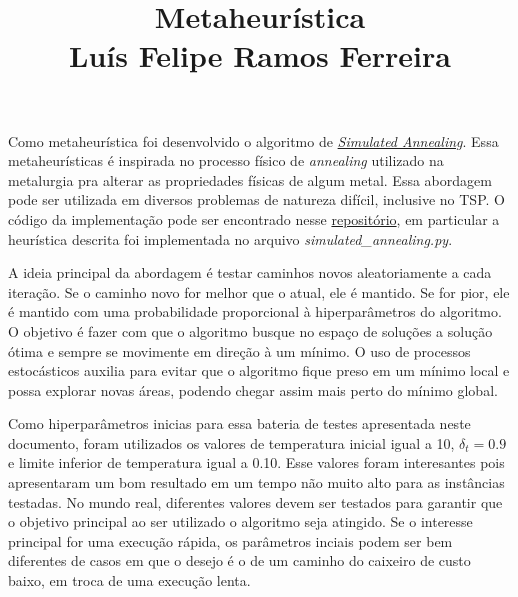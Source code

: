 \documentclass{article}
\title{\vspace{-3em} Metaheurística \\ Luís Felipe Ramos Ferreira \vspace{-3em}}
\date{}
\begin{document}
\maketitle

Como metaheurística foi desenvolvido o algoritmo de \href{https://en.wikipedia.org/wiki/Simulated_annealing}{\textit{Simulated Annealing}}. Essa metaheurísticas é inspirada
no processo físico de \textit{annealing} utilizado na metalurgia pra alterar as propriedades físicas de algum metal. Essa abordagem pode ser utilizada em diversos problemas de natureza difícil,
inclusive no TSP. O código da implementação pode ser encontrado nesse \href{https://github.com/lframosferreira/tsp-heuristics}{repositório}, em particular a heurística descrita foi implementada no arquivo
\textit{simulated\_annealing.py}.

A ideia principal da abordagem é testar caminhos novos aleatoriamente a cada iteração. Se o caminho novo for melhor que o atual, ele é mantido. Se for pior, ele é mantido com uma probabilidade proporcional à hiperparâmetros
do algoritmo. O objetivo é fazer com que o algoritmo busque no espaço de soluções a solução ótima e sempre se movimente em direção à um mínimo. O uso de processos estocásticos auxilia para evitar que o algoritmo
fique preso em um mínimo local e possa explorar novas áreas, podendo chegar assim mais perto do mínimo global.

Como hiperparâmetros inicias para essa bateria de testes apresentada neste documento, foram utilizados os valores de temperatura inicial igual a 10, \(\delta_t = 0.9\) e limite inferior de temperatura igual a 0.10. Esse valores foram interesantes
pois apresentaram um bom resultado em um tempo não muito alto para as instâncias testadas. No mundo real, diferentes valores devem ser testados para garantir que o objetivo principal ao ser utilizado o algoritmo seja atingido.
Se o interesse principal for uma execução rápida, os parâmetros inciais podem ser bem diferentes de casos em que o desejo é o de um caminho do caixeiro de custo baixo, em troca de uma execução lenta.
\end{document}
